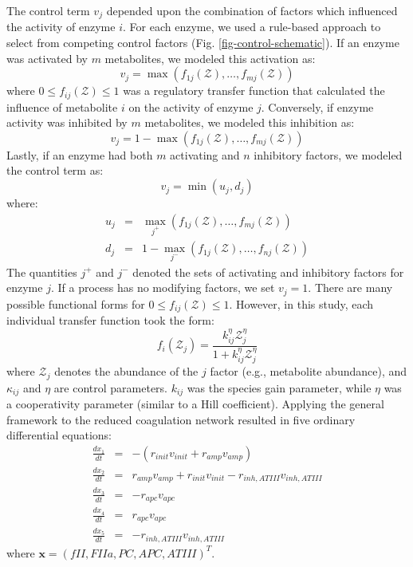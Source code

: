 \documentclass[processes,article,received,moreauthors,pdftex,12pt,a4paper]{mdpi}
\begin{document}
The control term $v_{j}$ depended upon the combination of factors which influenced the activity of enzyme $i$.
For each enzyme, we used a rule-based approach to select from competing control factors (Fig. \ref{fig-control-schematic}). 
If an enzyme was activated by $m$ metabolites, we modeled this activation as:
\begin{equation}
	v_{j} = \max\left(f_{1j}\left(\mathcal{Z}\right),\hdots,f_{mj}\left(\mathcal{Z}\right)\right)
\end{equation}where $0\leq f_{ij}\left(\mathcal{Z}\right)\leq 1$ was a regulatory transfer function that calculated the influence of metabolite $i$ on the activity of enzyme $j$. 
Conversely, if enzyme activity was inhibited by $m$ metabolites, we modeled this inhibition as:
\begin{equation}
	v_{j} = 1 - \max\left(f_{1j}\left(\mathcal{Z}\right),\hdots,f_{mj}\left(\mathcal{Z}\right)\right)
\end{equation}Lastly, if an enzyme had both $m$ activating and $n$ inhibitory factors, we modeled the control term as:
\begin{equation}
	v_{j} = \min\left(u_{j},d_{j}\right)
\end{equation}where:
\begin{eqnarray}
	u_{j} &=& \max_{j^{+}}\left(f_{1j}\left(\mathcal{Z}\right),\hdots,f_{mj}\left(\mathcal{Z}\right)\right) \\
	d_{j} &=& 1 - \max_{j^{-}}\left(f_{1j}\left(\mathcal{Z}\right),\hdots,f_{nj}\left(\mathcal{Z}\right)\right)
\end{eqnarray}
The quantities $j^{+}$ and $j^{-}$ denoted the sets of activating and inhibitory factors for enzyme $j$. 
If a process has no modifying factors, we set $v_{j} = 1$.
There are many possible functional forms for $0\leq f_{ij}\left(\mathcal{Z}\right)\leq 1$. 
However, in this study, each individual transfer function took the form:
\begin{equation}\label{eqn:control-factor}
	f_{i}\left(\mathcal{Z}_{j}\right) = \frac{k_{ij}^{\eta}\mathcal{Z}_{j}^{\eta}}{1 + k_{ij}^{\eta}\mathcal{Z}_{j}^{\eta}}
\end{equation}where $\mathcal{Z}_{j}$ denotes the abundance of the $j$ factor (e.g., metabolite abundance), and $\kappa_{ij}$ and $\eta$ are control parameters. 
$k_{ij}$ was the species gain parameter, while $\eta$ was a cooperativity parameter (similar to a Hill coefficient).
Applying the general framework to the reduced coagulation network resulted in five ordinary differential equations:
\begin{eqnarray}
	\frac{dx_{1}}{dt} & =& -\left(r_{init}v_{init} + r_{amp}v_{amp}\right)\\
	\frac{dx_{2}}{dt} &=& r_{amp}v_{amp} + r_{init}v_{init} - r_{inh,ATIII}v_{inh,ATIII}\\
	\frac{dx_{3}}{dt} &=& -r_{apc}v_{apc} \\
	\frac{dx_{4}}{dt} &=& r_{apc}v_{apc} \\
	\frac{dx_{5}}{dt} & = & -r_{inh,ATIII}v_{inh,ATIII}
\end{eqnarray}where $\mathbf{x} = \left(fII,FIIa,PC,APC,ATIII\right)^{T}$. 
\end{document}
